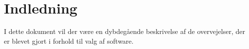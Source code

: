 \chapter{Indledning}
I dette dokument vil der være en dybdegående beskrivelse af de overvejelser, der er blevet gjort i forhold til valg af software.


